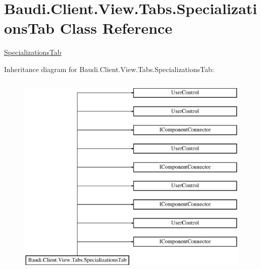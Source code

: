 \hypertarget{class_baudi_1_1_client_1_1_view_1_1_tabs_1_1_specializations_tab}{}\section{Baudi.\+Client.\+View.\+Tabs.\+Specializations\+Tab Class Reference}
\label{class_baudi_1_1_client_1_1_view_1_1_tabs_1_1_specializations_tab}


\hyperlink{class_baudi_1_1_client_1_1_view_1_1_tabs_1_1_specializations_tab}{Specializations\+Tab}  


Inheritance diagram for Baudi.\+Client.\+View.\+Tabs.\+Specializations\+Tab\+:\begin{figure}[H]
\begin{center}
\leavevmode
\includegraphics[height=10.000000cm]{class_baudi_1_1_client_1_1_view_1_1_tabs_1_1_specializations_tab}
\end{center}
\end{figure}

